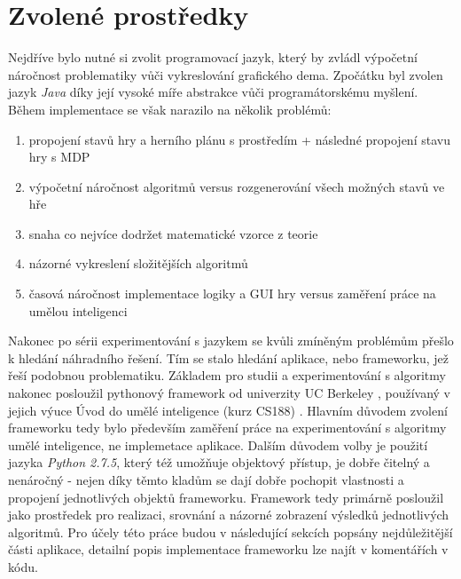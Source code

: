 \section{Zvolené prostředky}
Nejdříve bylo nutné si zvolit programovací jazyk, který by zvládl výpočetní náročnost problematiky vůči vykreslování grafického dema. Zpočátku byl zvolen jazyk \textit{Java} díky její vysoké míře abstrakce vůči programátorskému myšlení. Během implementace se však narazilo na několik problémů: 
\begin{enumerate}
\item propojení stavů hry a herního plánu s prostředím + následné propojení stavu hry s MDP
\item výpočetní náročnost algoritmů versus rozgenerování všech možných stavů ve hře
\item snaha co nejvíce dodržet matematické vzorce z teorie
\item názorné vykreslení složitějších algoritmů
\item časová náročnost implementace logiky a GUI hry versus zaměření práce na umělou inteligenci
\end{enumerate}
Nakonec po sérii experimentování s jazykem se kvůli zmíněným problémům přešlo k hledání náhradního řešení. Tím se stalo hledání aplikace, nebo frameworku, jež řeší podobnou problematiku. Základem pro studii a experimentování s algoritmy nakonec posloužil pythonový framework od univerzity UC Berkeley \cite{pacmanProjects}, používaný v jejich výuce Úvod do umělé inteligence (kurz CS188) \cite{berkeley}. Hlavním důvodem zvolení frameworku tedy bylo především zaměření práce na experimentování s algoritmy umělé inteligence, ne implemetace aplikace. Dalším důvodem volby je použití jazyka \textit{Python 2.7.5}, který též umožňuje objektový přístup, je dobře čitelný a nenáročný - nejen díky těmto kladům se dají dobře pochopit vlastnosti a propojení jednotlivých objektů frameworku. Framework tedy primárně posloužil jako prostředek pro realizaci, srovnání a názorné zobrazení výsledků jednotlivých algoritmů.
Pro účely této práce budou v následující sekcích popsány nejdůležitější části aplikace, detailní popis implementace frameworku lze najít v komentářích v kódu.


